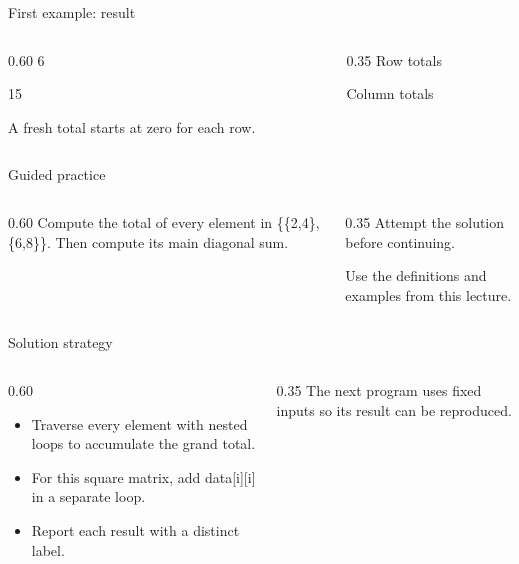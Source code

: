 \documentclass[10pt,aspectratio=169]{beamer}
\begin{document}
\begin{frame}[fragile,t]{First example: result}
\begin{columns}[T,onlytextwidth]\begin{column}{0.60\textwidth}
6\par 15\par A fresh total starts at zero for each row.
\end{column}\begin{column}{0.35\textwidth}\small
Row totals

Column totals
\end{column}\end{columns}
\end{frame}

\begin{frame}[fragile,t]{Guided practice}
\begin{columns}[T,onlytextwidth]\begin{column}{0.60\textwidth}
Compute the total of every element in \{\{2,4\},\{6,8\}\}. Then compute its main diagonal sum.
\end{column}\begin{column}{0.35\textwidth}\small
Attempt the solution before continuing.

Use the definitions and examples from this lecture.
\end{column}\end{columns}
\end{frame}

\begin{frame}[fragile,t]{Solution strategy}
\begin{columns}[T,onlytextwidth]\begin{column}{0.60\textwidth}
\begin{itemize}
\item Traverse every element with nested loops to accumulate the grand total.
\item For this square matrix, add data[i][i] in a separate loop.
\item Report each result with a distinct label.
\end{itemize}
\end{column}\begin{column}{0.35\textwidth}\small
The next program uses fixed inputs so its result can be reproduced.
\end{column}\end{columns}
\end{frame}
\end{document}
